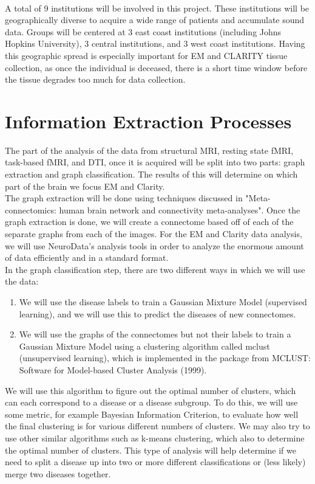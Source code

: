 \documentclass[12pt]{article}
\begin{document}
	\\
    \indent A total of 9 institutions will be involved in this project. These institutions will be geographically diverse to acquire a wide range of patients and accumulate sound data. Groups will be centered at 3 east coast institutions (including Johns Hopkins University), 3 central institutions, and 3 west coast institutions. Having this geographic spread is especially important for EM and CLARITY tissue collection, as once the individual is deceased, there is a short time window before the tissue degrades too much for data collection.

\section{Information Extraction Processes}
The part of the analysis of the data from structural MRI, resting state fMRI, task-based fMRI, and DTI, once it is acquired will be split into two parts: graph extraction and graph classification.  The results of this will determine on which part of the brain we focus EM and Clarity.
	\\
	\indent The graph extraction will be done using techniques discussed in "Meta-connectomics: human brain network and connectivity meta-analyses".  Once the graph extraction is done, we will create a connectome based off of each of the separate graphs from each of the images.  For the EM and Clarity data analysis, we will use NeuroData’s analysis tools in order to analyze the enormous amount of data efficiently and in a standard format.
	\\
	\indent In the graph classification step, there are two different ways in which we will use the data: 
    \begin{enumerate}
    \item We will use the disease labels to train a Gaussian Mixture Model (supervised learning), and we will use this to predict the diseases of new connectomes.
    \item We will use the graphs of the connectomes but not their labels to train a Gaussian Mixture Model using a clustering algorithm called mclust (unsupervised learning), which is implemented in the package from MCLUST: Software for Model-based Cluster Analysis (1999).
    \end{enumerate}
We will use this algorithm to figure out the optimal number of clusters, which can each correspond to a disease or a disease subgroup.  To do this, we will use some metric, for example Bayesian Information Criterion, to evaluate how well the final clustering is for various different numbers of clusters.  We may also try to use other similar algorithms such as k-means clustering, which also to determine the optimal number of clusters.  This type of analysis will help determine if we need to split a disease up into two or more different classifications or (less likely) merge two diseases together.
\end{document}
